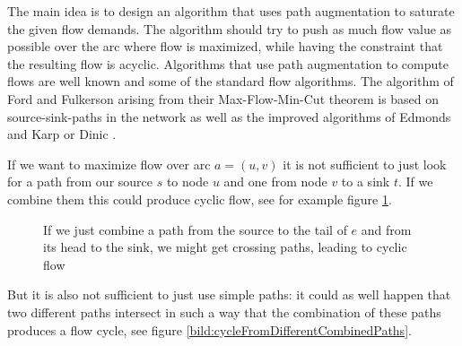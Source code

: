 The main idea is to design an algorithm that uses path augmentation to saturate the given flow demands. The 
algorithm should try to push as much flow value as possible over the arc where flow is maximized, while having the 
constraint that the resulting flow is acyclic. %
Algorithms that use path augmentation to compute flows are well known and some of the standard flow algorithms. The 
algorithm of Ford and Fulkerson \cite{Ford-Fulkerson_algo} arising from their Max-Flow-Min-Cut theorem is based on 
source-sink-paths in the network as well as the improved algorithms of Edmonds and Karp \cite{EdmondsKarp1972} or Dinic 
\cite{Dinic1970}. 

If we want to maximize flow over arc $a=(u,v)$ it is not sufficient to just look for a path from our source $s$ to node 
$u$ and one from node $v$ to a sink $t$. If we combine them this could produce cyclic flow, see for example figure 
\ref{bild:cycleFromCombinedPaths}. %

\begin{figure}[h!]
\centering
{}
\caption{If we just combine a path from the source to the tail of $e$ and from its head to the sink, we might get 
crossing paths, leading to cyclic flow}
 \label{bild:cycleFromCombinedPaths}
\end{figure}

But it is also not sufficient to just use simple paths: it could as well happen that two different paths intersect in 
such a way that the combination of these paths produces a flow cycle, see figure 
\ref{bild:cycleFromDifferentCombinedPaths}.


